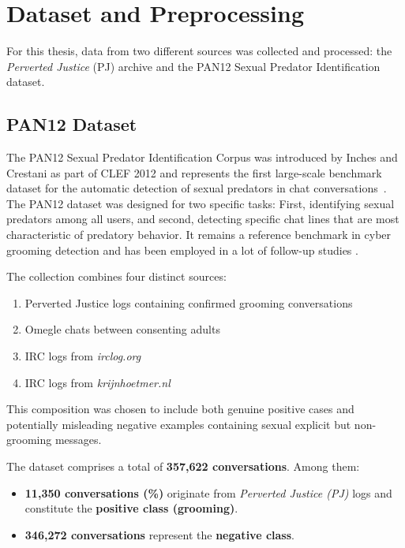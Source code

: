 \chapter{Dataset and Preprocessing}

For this thesis, data from two different sources was collected and processed: the \textit{Perverted Justice} (PJ) archive and the PAN12 Sexual Predator Identification dataset.

\section{PAN12 Dataset}
The PAN12 Sexual Predator Identification Corpus was introduced by Inches and Crestani as part of CLEF 2012 and represents the first large-scale benchmark dataset for the automatic detection of sexual predators in chat conversations~\cite{inches2012pan}. The PAN12 dataset was designed for two specific tasks: First, identifying sexual predators among all users, and second, detecting specific chat lines that are most characteristic of predatory behavior. It remains a reference benchmark in cyber grooming detection and has been employed in a lot of follow-up studies \cite{inches2012pan}.

The collection combines four distinct sources: 

\begin{enumerate}
    \item Perverted Justice logs containing confirmed grooming conversations
    \item Omegle chats between consenting adults
    \item IRC logs from \textit{irclog.org}
    \item IRC logs from \textit{krijnhoetmer.nl}
\end{enumerate}

 This composition was chosen to include both genuine positive cases and potentially misleading negative examples containing sexual explicit but non-grooming messages.  

The dataset comprises a total of \textbf{357{,}622 conversations}.  
Among them:  
\begin{itemize}
    \item \textbf{11{,}350 conversations (\%)} originate from \textit{Perverted Justice (PJ)} logs and constitute the \textbf{positive class (grooming)}.
    \item \textbf{346{,}272 conversations} represent the \textbf{negative class}.
\end{itemize}


